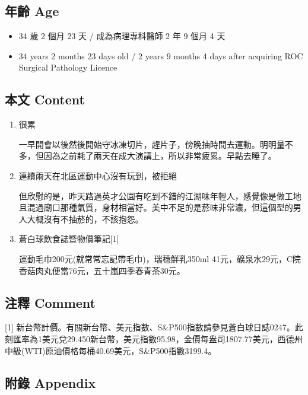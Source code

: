 \documentclass[
]{article}
\providecommand{\tightlist}{%
  \setlength{\itemsep}{0pt}\setlength{\parskip}{0pt}}
\begin{document}
\hypertarget{ux5e74ux9f61-age-14}{%
\subsection{年齡 Age}\label{ux5e74ux9f61-age-14}}

\begin{itemize}
\tightlist
\item
  34 歲 2 個月 23 天 / 成為病理專科醫師 2 年 9 個月 4 天
\item
  34 years 2 months 23 days old / 2 years 9 months 4 days after
  acquiring ROC Surgical Pathology Licence
\end{itemize}

\hypertarget{ux672cux6587-content-14}{%
\subsection{本文 Content}\label{ux672cux6587-content-14}}

\begin{enumerate}
\def\labelenumi{\arabic{enumi}.}
\item
  很累

  一早開會以後然後開始守冰凍切片，趕片子，傍晚抽時間去運動。明明量不多，但因為之前耗了兩天在成大演講上，所以非常疲累。早點去睡了。
\item
  連續兩天在北區運動中心沒有玩到，被拒絕

  但欣慰的是，昨天路過英才公園有吃到不錯的江湖味年輕人，感覺像是做工地且混過廟口那種氣質，身材相當好。美中不足的是菸味非常濃，但這個型的男人大概沒有不抽菸的，不該抱怨。
\item
  蒼白球飲食誌暨物價筆記{[}1{]}

  運動毛巾200元(就常常忘記帶毛巾)，瑞穗鮮乳350ml
  41元，礦泉水29元，C院香菇肉丸便當76元，五十嵐四季春青茶30元。
\end{enumerate}

\hypertarget{ux6ce8ux91cb-comment-14}{%
\subsection{注釋 Comment}\label{ux6ce8ux91cb-comment-14}}

{[}1{]}
新台幣計價。有關新台幣、美元指數、S\&P500指數請參見蒼白球日誌0247。此刻匯率為1美元兌29.450新台幣，美元指數95.98，金價每盎司1807.77美元，西德州中級(WTI)原油價格每桶40.69美元，S\&P500指數3199.4。

\hypertarget{ux9644ux9304-appendix-14}{%
\subsection{附錄 Appendix}\label{ux9644ux9304-appendix-14}}
\end{document}
